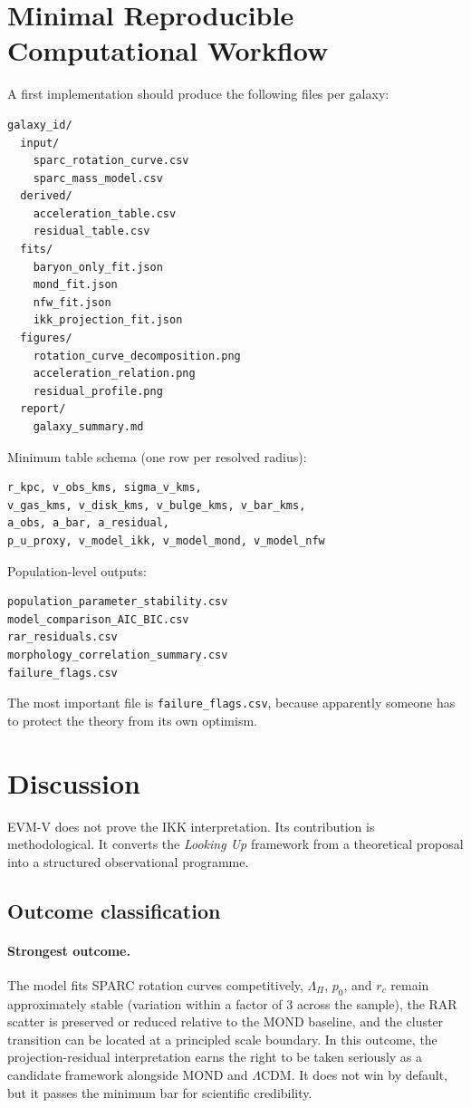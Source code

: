 \documentclass[11pt,a4paper,oneside]{article}
\newcommand{\LamPi}{\Lambda_{\Pi}}
\newcommand{\pzero}{p_0}
\newcommand{\rc}{r_c}
\begin{document}
\section{Minimal Reproducible Computational Workflow}

A first implementation should produce the following files per galaxy:
\begin{verbatim}
galaxy_id/
  input/
    sparc_rotation_curve.csv
    sparc_mass_model.csv
  derived/
    acceleration_table.csv
    residual_table.csv
  fits/
    baryon_only_fit.json
    mond_fit.json
    nfw_fit.json
    ikk_projection_fit.json
  figures/
    rotation_curve_decomposition.png
    acceleration_relation.png
    residual_profile.png
  report/
    galaxy_summary.md
\end{verbatim}

Minimum table schema (one row per resolved radius):
\begin{verbatim}
r_kpc, v_obs_kms, sigma_v_kms,
v_gas_kms, v_disk_kms, v_bulge_kms, v_bar_kms,
a_obs, a_bar, a_residual,
p_u_proxy, v_model_ikk, v_model_mond, v_model_nfw
\end{verbatim}

Population-level outputs:
\begin{verbatim}
population_parameter_stability.csv
model_comparison_AIC_BIC.csv
rar_residuals.csv
morphology_correlation_summary.csv
failure_flags.csv
\end{verbatim}

The most important file is \texttt{failure\_flags.csv}, because apparently someone has
to protect the theory from its own optimism.

\section{Discussion}

EVM-V does not prove the IKK interpretation. Its contribution is methodological. It
converts the \emph{Looking Up} framework from a theoretical proposal into a structured
observational programme.

\subsection{Outcome classification}

\paragraph{Strongest outcome.}
The model fits SPARC rotation curves competitively, $\LamPi$, $\pzero$, and $\rc$
remain approximately stable (variation within a factor of 3 across the sample), the
RAR scatter is preserved or reduced relative to the MOND baseline, and the cluster
transition can be located at a principled scale boundary. In this outcome, the
projection-residual interpretation earns the right to be taken seriously as a candidate
framework alongside MOND and $\Lambda$CDM. It does not win by default, but it passes
the minimum bar for scientific credibility.
\end{document}
